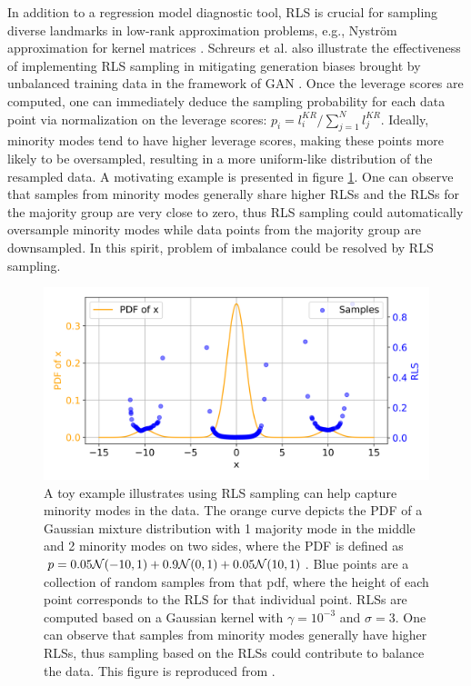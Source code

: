 In addition to a regression model diagnostic tool, RLS is crucial for sampling diverse landmarks in low-rank approximation problems, e.g., Nystr\"{o}m approximation for kernel matrices \cite{fanuelDiversitySamplingImplicit2021, mccurdyRidgeRegressionProvable2018}.  Schreurs et al. also illustrate the effectiveness of implementing RLS sampling in mitigating generation biases brought by unbalanced training data in the framework of GAN \cite{schreursLeverageScoreSampling2022}. Once the leverage scores are computed, one can immediately deduce the sampling probability for each data point via normalization on the leverage scores: $p_i = l^{KR}_i / \sum_{j=1}^N l^{KR}_j$. Ideally, minority modes tend to have higher leverage scores, making these points more likely to be oversampled, resulting in a more uniform-like distribution of the resampled data. A motivating example is presented in figure \ref{rls-demo}. One can observe that samples from minority modes generally share higher RLSs and the RLSs for the majority group are very close to zero, thus RLS sampling could automatically oversample minority modes while data points from the majority group are downsampled. In this spirit, problem of imbalance could be resolved by RLS sampling.

\begin{figure}[ht]
    \centering
    \includegraphics[width=0.8\linewidth]{Figures/Methods/rls-demo.png}
    \caption{A toy example illustrates using RLS sampling can help capture minority modes in the data. The orange curve depicts the PDF of a Gaussian mixture distribution with 1 majority mode in the middle and 2 minority modes on two sides, where the PDF is defined as $p=0.05\mathcal{N}(-10,1) + 0.9\mathcal{N}(0,1) + 0.05\mathcal{N}(10,1)$. Blue points are a collection of random samples from that pdf, where the height of each point corresponds to the RLS for that individual point. RLSs are computed based on a Gaussian kernel with $\gamma=10^{-3}$ and $\sigma=3$. One can observe that samples from minority modes generally have higher RLSs, thus sampling based on the RLSs could contribute to balance the data. This figure is reproduced from \cite{schreursLeverageScoreSampling2022}.}
    \label{rls-demo}
\end{figure}

